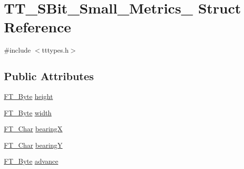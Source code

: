 \hypertarget{struct_t_t___s_bit___small___metrics__}{\section{T\-T\-\_\-\-S\-Bit\-\_\-\-Small\-\_\-\-Metrics\-\_\- Struct Reference}
\label{struct_t_t___s_bit___small___metrics__}
}


{\ttfamily \#include $<$tttypes.\-h$>$}

\subsection*{Public Attributes}
\begin{DoxyCompactItemize}
\item 
\hyperlink{fttypes_8h_a51f26183ca0c9f4af958939648caeccd}{F\-T\-\_\-\-Byte} \hyperlink{struct_t_t___s_bit___small___metrics___aecc44b5e504d5ce27521505ed53420c8}{height}
\item 
\hyperlink{fttypes_8h_a51f26183ca0c9f4af958939648caeccd}{F\-T\-\_\-\-Byte} \hyperlink{struct_t_t___s_bit___small___metrics___ad2401ae208b1663d0085ca06a04885fe}{width}
\item 
\hyperlink{fttypes_8h_a0f851552b050883885f0a0855771f39d}{F\-T\-\_\-\-Char} \hyperlink{struct_t_t___s_bit___small___metrics___a4361ae83a66706852c0c7d4c4ddff9c2}{bearing\-X}
\item 
\hyperlink{fttypes_8h_a0f851552b050883885f0a0855771f39d}{F\-T\-\_\-\-Char} \hyperlink{struct_t_t___s_bit___small___metrics___aba8cbfd6203f4083b8fb305f88d6d1fc}{bearing\-Y}
\item 
\hyperlink{fttypes_8h_a51f26183ca0c9f4af958939648caeccd}{F\-T\-\_\-\-Byte} \hyperlink{struct_t_t___s_bit___small___metrics___a056c5ea71ec3339ca9b7356ea7c90e37}{advance}
\end{DoxyCompactItemize}


